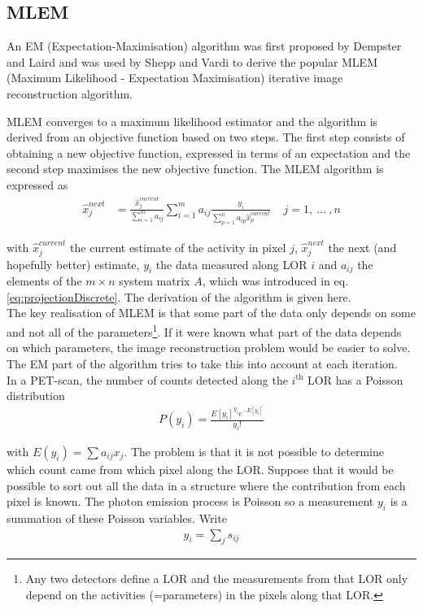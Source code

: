 \documentclass[report,12pt]{report}
\newcommand{\superscript}[1]{\ensuremath{^{\textrm{#1}}}}
\begin{document}
\subsection{MLEM}\label{sec:mlem}
An EM (Expectation-Maximisation) algorithm was first proposed by Dempster and Laird \cite{dempster} and was used by Shepp and Vardi \cite{1982 shepp} to derive the popular MLEM (Maximum Likelihood - Expectation Maximisation) iterative image reconstruction algorithm. 

MLEM converges to a maximum likelihood estimator and the algorithm is derived from an objective function based on two steps. The first step consists of obtaining a new objective function, expressed in terms of an expectation and the second step maximises the new objective function. The MLEM algorithm is expressed as
\begin{align}
	\hat x_{j}^{next} &= \frac{\hat x_{j}^{current}}{\sum_{i=1}^{m}a_{ij}} \sum_{i=1}^{m}a_{ij}
	\frac{y_{i}}{\sum_{p=1}^{n}a_{ip}\hat x_{p}^{current}} \ \ \ \ \ j = 1,\ ...\ ,n
	\label{eq:mlem}
\end{align}

with $\hat x_{j}^{current}$ the current estimate of the activity in pixel $j$, $\hat x_{j}^{next}$ the next (and hopefully better) estimate, $y_i$ the data measured along LOR $i$ and $a_{ij}$ the elements of the $m \times n$ system matrix $A$, which was introduced in eq. \ref{eq:projectionDiscrete}. The derivation of the algorithm is given here.\\

The key realisation of MLEM is that some part of the data only depends on some and not all of the parameters\footnote{Any two detectors define a LOR and the measurements from that LOR only depend on the activities (=parameters) in the pixels along that LOR.}. If it were known what part of the data depends on which parameters, the image reconstruction problem would be easier to solve. The EM part of the algorithm tries to take this into account at each iteration.\\

In a PET-scan, the number of counts detected along the $i$\superscript{th} LOR has a Poisson distribution
\begin{align}
	P(y_i) = \frac{E[y_i]^{y_i} e^{-E[y_i]}}{y_i!}
	\label{eq:g}
\end{align}
	
with $E(y_i) = \sum a_{ij}x_j$. The problem is that it is not possible to determine which count came from which pixel along the LOR. Suppose that it would be possible to sort out all the data in a structure where the contribution from each pixel is known. The photon emission process is Poisson so a measurement $y_i$ is a summation of these Poisson variables. Write
\begin{align}
	y_i = \sum_{j} s_{ij}
\end{align}
\end{document}
